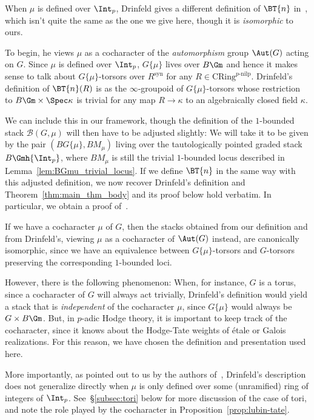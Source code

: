 \documentclass[10pt]{amsart}
\begin{document}
\begin{remark}
\label{rem:drinfeld_definition}
When $\mu$ is defined over $\Int_p$, Drinfeld gives a different definition of $\BT{n}$ in~\cite{drinfeld2023shimurian}, which isn't quite the same as the one we give here, though it is \emph{isomorphic} to ours. 

To begin, he views $\mu$ as a cocharacter of the \emph{automorphism} group $\Aut(G)$ acting on $G$. Since $\mu$ is defined over $\Int_p$, $G\{\mu\}$ lives over $B\Gm$ and hence it makes sense to talk about $G\{\mu\}$-torsors over $R^{\mathrm{syn}}$ for any $R\in \mathrm{CRing}^{p\text{-nilp}}$. Drinfeld's definition of $\BT{n}(R)$ is as the $\infty$-groupoid of $G\{\mu\}$-torsors whose restriction to $B\Gm\times \Spec \kappa$ is trivial for any map $R\to \kappa$ to an algebraically closed field $\kappa$. 

We can include this in our framework, though the definition of the $1$-bounded stack $\mathcal{B}(G,\mu)$ will then have to be adjusted slightly: We will take it to be given by the pair $(BG\{\mu\},BM_\mu)$ living over the tautologically pointed graded stack $B\Gmh{\Int_p}$, where $BM_\mu$ is still the trivial $1$-bounded locus described in Lemma~\ref{lem:BGmu_trivial_locus}. If we define $\BT{n}$ in the same way with this adjusted definition, we now recover Drinfeld's definition and Theorem~\ref{thm:main_thm_body} and its proof below hold verbatim. In particular, we obtain a proof of~\cite[Conjecture C.3.1]{drinfeld2024shimurian}.

If we have a cocharacter $\mu$ of $G$, then the stacks obtained from our definition and from Drinfeld's, viewing $\mu$ as a cocharacter of $\Aut(G)$ instead, are canonically isomorphic, since we have an equivalence between $G\{\mu\}$-torsors and $G$-torsors preserving the corresponding $1$-bounded loci. 

However, there is the following phenomenon: When, for instance, $G$ is a torus, since a cocharacter of $G$ will always act trivially, Drinfeld's definition would yield a stack that is \emph{independent} of the cocharacter $\mu$, since $G\{\mu\}$ would always be $G\times B\Gm$. But, in $p$-adic Hodge theory, it is important to keep track of the cocharacter, since it knows about the Hodge-Tate weights of \'etale or Galois realizations. For this reason, we have chosen the definition and presentation used here. 

More importantly, as pointed out to us by the authors of~\cite{imai2023prismatic}, Drinfeld's description does not generalize directly when $\mu$ is only defined over some (unramified) ring of integers of $\Int_p$. See~\S\ref{subsec:tori} below for more discussion of the case of tori, and note the role played by the cocharacter in Proposition~\ref{prop:lubin-tate}.
\end{remark}
\end{document}

